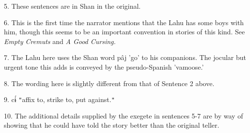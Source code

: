 5. These sentences are in Shan in the original.

6. This is the first time the narrator mentions that the Lahu has some boys with
him, though this seems to be an important convention in stories of this kind. See\textit{
Empty Cremuts} and \textit{A Good Cursing.}

7. The Lahu here uses the Shan word pâj 'go' to his companions. The jocular but
urgent tone this adds is conveyed by the pseudo-Spanish 'vamoose.'

8. The wording here is slightly different from that of Sentence 2 above.

9. cɨ́ \texttt{"}affix to, strike to, put against.\texttt{"}

10. The additional details supplied by the exegete in sentences 5-7 are by way
of showing that he could have told the story better than the original teller.




